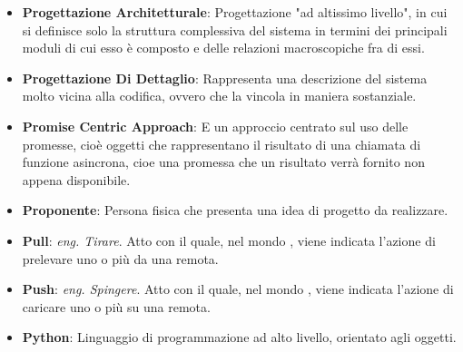 \begin{itemize}
	\item
	\textbf{Progettazione Architetturale}: Progettazione "ad altissimo livello", in cui si definisce solo la struttura complessiva del sistema in termini dei principali moduli di cui esso è composto e delle relazioni macroscopiche fra di essi.
	\item
	\textbf{Progettazione Di Dettaglio}: Rappresenta una descrizione del sistema molto vicina alla codifica, ovvero che la vincola in maniera sostanziale.
	\item
	\textbf{Promise Centric Approach}: E un approccio centrato sul uso delle promesse, cioè oggetti che rappresentano il risultato di una chiamata di funzione asincrona, cioe una promessa che un risultato verrà fornito non appena disponibile.
	\item
	\textbf{Proponente}: Persona fisica che presenta una idea di progetto da realizzare.
	\item
	\textbf{Pull}: \textit{eng. Tirare}. Atto con il quale, nel mondo , viene indicata l'azione di prelevare uno o più  da una  remota.
	\item
	\textbf{Push}: \textit{eng. Spingere}. Atto con il quale, nel mondo , viene indicata l'azione di caricare uno o più  su una  remota.
	\item
	\textbf{Python}: Linguaggio di programmazione ad alto livello, orientato agli oggetti.
\end{itemize}
\newpage